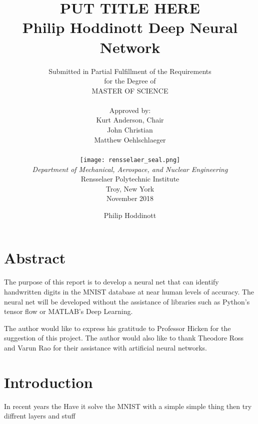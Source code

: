 \documentclass[12pt]{article}
\title{ 
		\LARGE \textbf{\uppercase{Put Title Here}} \\
		\vspace{0.25cm}
		\LARGE \textbf{Philip Hoddinott}
	}
\author{\small{Submitted in Partial Fulfillment of the Requirements} \\ \small{for the Degree of} \\
		\uppercase{Master of Science} \\ \\
		Approved by:
		\\ Kurt Anderson, Chair \\ John Christian \\ Matthew Oehlschlaeger \\ \\ %
		\texttt{[image: rensselaer\_seal.png]} \\
		\small{\textit{Department of Mechanical, Aerospace, and Nuclear Engineering}} \\
		\small{Rensselaer Polytechnic Institute} \\ 
		\small{Troy, New York} \\
		\small{November 2018}
	}
\begin{document}
	\clearpage
		\title{Deep Neural Network}
	\author{Philip Hoddinott}
	
	\maketitle


	


	
	



	
\tableofcontents
\listoffigures	
	\newpage
	\section*{Abstract}
	The purpose of this report is to develop a neural net that can identify handwritten digits in the MNIST database at near human levels of accuracy. The neural net will be developed without the assistance of libraries such as Python's tensor flow or MATLAB's Deep Learning.\par 
	The author would like to express his gratitude to Professor Hicken for the suggestion of this project. The author would also like to thank Theodore Ross and Varun Rao for their assistance with artificial neural networks.
	



	\section{Introduction}
	In recent years the 
	Have it solve the MNIST with a simple simple thing
	then try diffrent layers and stuff
	
\end{document}
